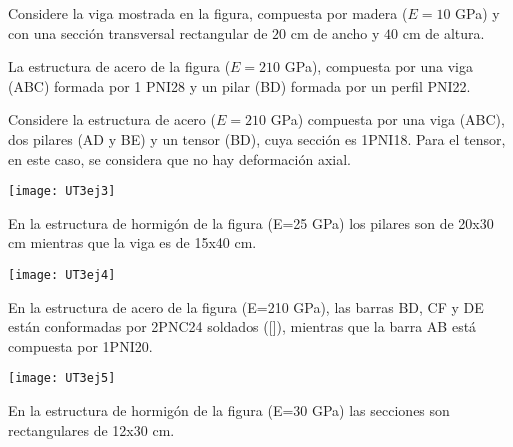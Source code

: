 \ejercicio

Considere la viga mostrada en la figura, compuesta por madera ($E=10$ GPa) y con una sección transversal rectangular de $20$ cm de ancho y $40$ cm de altura.

\begin{center}
	\def\svgwidth{0.8\textwidth}
	
\end{center}




\ejercicio

La estructura de acero de la figura ($E=210$ GPa), compuesta por una viga (ABC) formada por 1 PNI28 y un pilar (BD) formada por un perfil PNI22.

\begin{center}
	\def\svgwidth{0.8\textwidth}
	
\end{center}




\ejercicio

Considere la estructura de acero ($E=210$ GPa) compuesta por una viga (ABC), dos pilares (AD y BE) y un tensor (BD), cuya sección es 1PNI18. Para el tensor, en este caso, se considera que no hay deformación axial.

\begin{center}
	\texttt{[image: UT3ej3]}
\end{center}



\ejercicio

En la estructura de hormigón de la figura (E=25 GPa) los pilares son de 20x30 cm mientras que la viga es de 15x40 cm. 

\begin{center}
	\texttt{[image: UT3ej4]}
\end{center}


\ejercicio

En la estructura de acero de la figura (E=210 GPa), las barras BD, CF y DE están conformadas por 2PNC24 soldados ([]), mientras que la barra AB está compuesta por 1PNI20. 


\begin{center}
	\texttt{[image: UT3ej5]}
\end{center}



\ejercicio 

En la estructura de hormigón de la figura (E=30 GPa) las secciones son rectangulares de 12x30 cm. 


